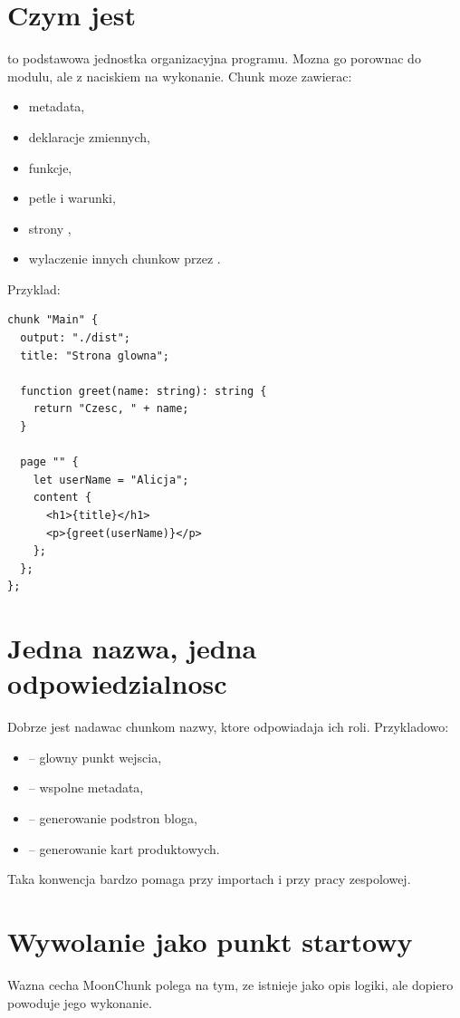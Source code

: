 \section{Czym jest }
 to podstawowa jednostka organizacyjna programu. Mozna go porownac do
modulu, ale z naciskiem na wykonanie. Chunk moze zawierac:

\begin{itemize}
  \item metadata,
  \item deklaracje zmiennych,
  \item funkcje,
  \item petle i warunki,
  \item strony ,
  \item wylaczenie innych chunkow przez .
\end{itemize}

Przyklad:

\begin{lstlisting}[style=moonchunk,caption={Chunk zawierajacy kilka rodzajow elementow}]
chunk "Main" {
  output: "./dist";
  title: "Strona glowna";

  function greet(name: string): string {
    return "Czesc, " + name;
  }

  page "" {
    let userName = "Alicja";
    content {
      <h1>{title}</h1>
      <p>{greet(userName)}</p>
    };
  };
};
\end{lstlisting}

\section{Jedna nazwa, jedna odpowiedzialnosc}
Dobrze jest nadawac chunkom nazwy, ktore odpowiadaja ich roli. Przykladowo:

\begin{itemize}
  \item {} -- glowny punkt wejscia,
  \item {} -- wspolne metadata,
  \item {} -- generowanie podstron bloga,
  \item {} -- generowanie kart produktowych.
\end{itemize}

Taka konwencja bardzo pomaga przy importach i przy pracy zespolowej.

\section{Wywolanie  jako punkt startowy}
Wazna cecha MoonChunk polega na tym, ze  istnieje jako opis logiki,
ale dopiero  powoduje jego wykonanie.

